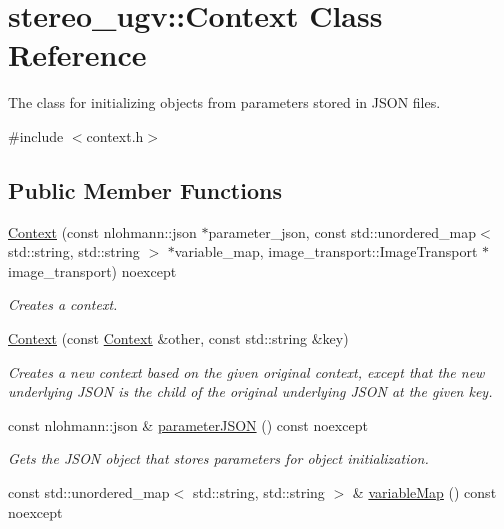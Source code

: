 \hypertarget{classstereo__ugv_1_1Context}{}\section{stereo\+\_\+ugv\+:\+:Context Class Reference}
\label{classstereo__ugv_1_1Context}


The class for initializing objects from parameters stored in J\+S\+ON files.  




{\ttfamily \#include $<$context.\+h$>$}

\subsection*{Public Member Functions}
\begin{DoxyCompactItemize}
\item 
\hyperlink{classstereo__ugv_1_1Context_a408832fdf3245f3d91c9ea794ebbc71c}{Context} (const nlohmann\+::json $\ast$parameter\+\_\+json, const std\+::unordered\+\_\+map$<$ std\+::string, std\+::string $>$ $\ast$variable\+\_\+map, image\+\_\+transport\+::\+Image\+Transport $\ast$image\+\_\+transport) noexcept
\begin{DoxyCompactList}\small\item\em Creates a context. \end{DoxyCompactList}\item 
\hyperlink{classstereo__ugv_1_1Context_a2c89fdaa8a60d2b8d1dae87e11142f03}{Context} (const \hyperlink{classstereo__ugv_1_1Context}{Context} \&other, const std\+::string \&key)
\begin{DoxyCompactList}\small\item\em Creates a new context based on the given original context, except that the new underlying J\+S\+ON is the child of the original underlying J\+S\+ON at the given key. \end{DoxyCompactList}\item 
const nlohmann\+::json \& \hyperlink{classstereo__ugv_1_1Context_a6b40977abc9924a49282b26e05d866aa}{parameter\+J\+S\+ON} () const noexcept
\begin{DoxyCompactList}\small\item\em Gets the J\+S\+ON object that stores parameters for object initialization. \end{DoxyCompactList}\item 
const std\+::unordered\+\_\+map$<$ std\+::string, std\+::string $>$ \& \hyperlink{classstereo__ugv_1_1Context_a0071b4b8bc7f1b9a5c1ce541a68334e0}{variable\+Map} () const noexcept

\end{DoxyCompactItemize}
